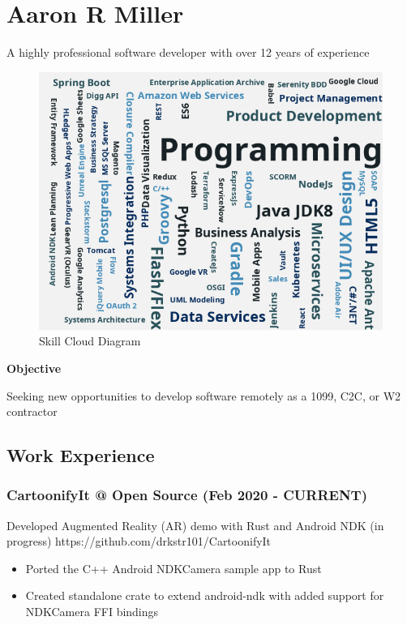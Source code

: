\hypertarget{aaron-r-miller}{%
\section{Aaron R Miller}\label{aaron-r-miller}}

A highly professional software developer with over 12 years of
experience

\begin{figure}
\centering
\includegraphics{img/skillcoud-1.0.0.png}
\caption{Skill Cloud Diagram}
\end{figure}

\textbf{Objective}

Seeking new opportunities to develop software remotely as a 1099, C2C,
or W2 contractor

\hypertarget{work-experience}{%
\subsection{Work Experience}\label{work-experience}}

\hypertarget{cartoonifyit-open-source-feb-2020---current}{%
\subsubsection{CartoonifyIt @ Open Source (Feb 2020 -
CURRENT)}\label{cartoonifyit-open-source-feb-2020---current}}

Developed Augmented Reality (AR) demo with Rust and Android NDK (in
progress) https://github.com/drkstr101/CartoonifyIt

\begin{itemize}
\tightlist
\item
  Ported the C++ Android NDKCamera sample app to Rust
\item
  Created standalone crate to extend android-ndk with added support for
  NDKCamera FFI bindings
\end{itemize}

